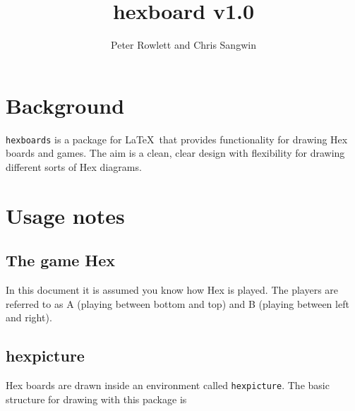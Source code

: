 \documentclass[a4paper,12pt]{article}
\title{hexboard v1.0}
\author{Peter Rowlett and Chris Sangwin}
\begin{document}
   
    
    \maketitle 
    
    \begin{center}
        \begin{hexgame}[4]
        \end{hexgame}
    \end{center}
    
    \tableofcontents
    
    \section{Background}
    
    \verb|hexboards| is a package for \LaTeX\ that provides functionality for drawing Hex boards and games. The aim is a clean, clear design with flexibility for drawing different sorts of Hex diagrams. 
    
    \section{Usage notes}
    
    \subsection{The game Hex}
    
    In this document it is assumed you know how Hex is played. The players are referred to as A (playing between bottom and top) and B (playing between left and right).
    
    \subsection{hexpicture}
    
    Hex boards are drawn inside an environment called \verb|hexpicture|. The basic structure for drawing with this package is 
    
\end{document}

